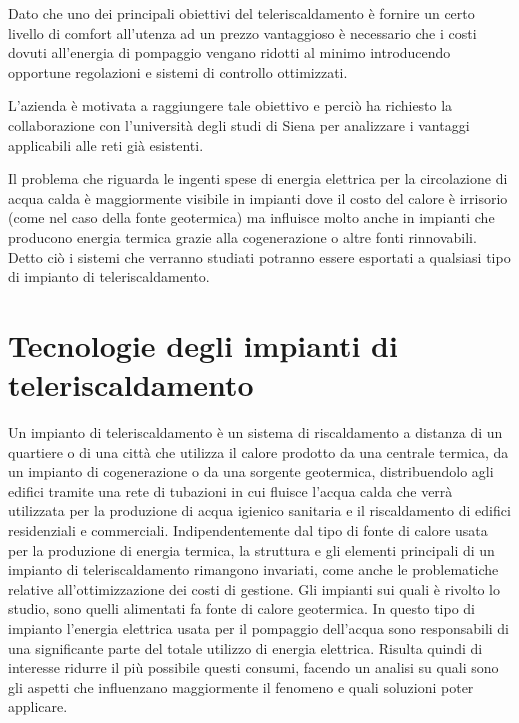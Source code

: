 \documentclass[laurea,oneside,11pt]{USiena_tesiLM}
\begin{document}
Dato che uno dei principali obiettivi del teleriscaldamento è fornire un certo livello di comfort all'utenza ad un prezzo vantaggioso è necessario che i costi dovuti all'energia di pompaggio vengano ridotti al minimo introducendo opportune regolazioni e sistemi di controllo ottimizzati. 

L'azienda è motivata a raggiungere tale obiettivo e perciò ha richiesto la collaborazione con l'università degli studi di Siena per analizzare i vantaggi applicabili alle reti già esistenti.

Il problema che riguarda le ingenti spese di energia elettrica per la circolazione di acqua calda è maggiormente visibile in impianti dove il costo del calore è irrisorio (come nel caso della fonte geotermica) ma influisce molto anche in impianti che producono energia termica grazie alla cogenerazione o altre fonti rinnovabili. Detto ciò i sistemi che verranno studiati potranno essere esportati a qualsiasi tipo di impianto di teleriscaldamento.


\chapter{Tecnologie degli impianti di teleriscaldamento}
Un impianto di teleriscaldamento è un  sistema di riscaldamento a distanza di un quartiere o di una città 
che utilizza il calore prodotto da una centrale termica, da un impianto di cogenerazione o da una sorgente geotermica, distribuendolo agli edifici tramite una rete di tubazioni in cui fluisce l'acqua calda che verrà utilizzata per la produzione di acqua igienico sanitaria e il riscaldamento di edifici residenziali e commerciali. Indipendentemente dal tipo di fonte di calore usata per la produzione di energia termica, la struttura e gli elementi principali di un impianto di teleriscaldamento rimangono invariati, come anche le problematiche relative all'ottimizzazione dei costi di gestione. Gli impianti sui quali è rivolto lo studio, sono quelli alimentati fa fonte di calore geotermica. In questo tipo di impianto l'energia elettrica usata per il pompaggio dell'acqua sono responsabili di una significante parte del totale utilizzo di energia elettrica. Risulta quindi di interesse ridurre il più possibile questi consumi, facendo un analisi su quali sono gli aspetti che influenzano maggiormente il fenomeno e quali soluzioni poter applicare. 
\end{document}
